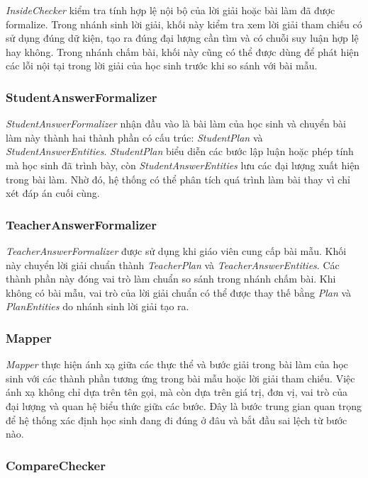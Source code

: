 \documentclass[12pt,a4paper]{article}
\begin{document}
\textit{InsideChecker} kiểm tra tính hợp lệ nội bộ của lời giải hoặc bài làm đã được formalize. Trong nhánh sinh lời giải, khối này kiểm tra xem lời giải tham chiếu có sử dụng đúng dữ kiện, tạo ra đúng đại lượng cần tìm và có chuỗi suy luận hợp lệ hay không. Trong nhánh chấm bài, khối này cũng có thể được dùng để phát hiện các lỗi nội tại trong lời giải của học sinh trước khi so sánh với bài mẫu.

\subsubsection{StudentAnswerFormalizer}

\textit{StudentAnswerFormalizer} nhận đầu vào là bài làm của học sinh và chuyển bài làm này thành hai thành phần có cấu trúc: \textit{StudentPlan} và \textit{StudentAnswerEntities}. \textit{StudentPlan} biểu diễn các bước lập luận hoặc phép tính mà học sinh đã trình bày, còn \textit{StudentAnswerEntities} lưu các đại lượng xuất hiện trong bài làm. Nhờ đó, hệ thống có thể phân tích quá trình làm bài thay vì chỉ xét đáp án cuối cùng.

\subsubsection{TeacherAnswerFormalizer}

\textit{TeacherAnswerFormalizer} được sử dụng khi giáo viên cung cấp bài mẫu. Khối này chuyển lời giải chuẩn thành \textit{TeacherPlan} và \textit{TeacherAnswerEntities}. Các thành phần này đóng vai trò làm chuẩn so sánh trong nhánh chấm bài. Khi không có bài mẫu, vai trò của lời giải chuẩn có thể được thay thế bằng \textit{Plan} và \textit{PlanEntities} do nhánh sinh lời giải tạo ra.

\subsubsection{Mapper}

\textit{Mapper} thực hiện ánh xạ giữa các thực thể và bước giải trong bài làm của học sinh với các thành phần tương ứng trong bài mẫu hoặc lời giải tham chiếu. Việc ánh xạ không chỉ dựa trên tên gọi, mà còn dựa trên giá trị, đơn vị, vai trò của đại lượng và quan hệ biểu thức giữa các bước. Đây là bước trung gian quan trọng để hệ thống xác định học sinh đang đi đúng ở đâu và bắt đầu sai lệch từ bước nào.

\subsubsection{CompareChecker}
\end{document}
